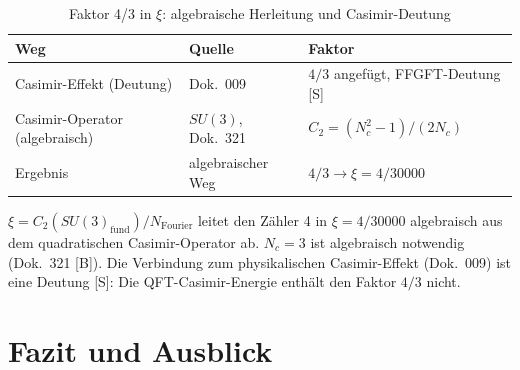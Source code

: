 \begin{table}[h]
\centering
\caption{Faktor 4/3 in $\xi$: algebraische Herleitung und Casimir-Deutung}
\label{tab:casimir_wege}
\begin{tabular}{lll}
\toprule
Weg & Quelle & Faktor \\
\midrule
Casimir-Effekt (Deutung) & Dok.~009 & $4/3$ angefügt, FFGFT-Deutung [S] \\
Casimir-Operator (algebraisch) & $SU(3)$, Dok.~321 & $C_2 = (N_c^2-1)/(2N_c)$ \\
\midrule
Ergebnis & algebraischer Weg & $4/3 \to \xi = 4/30000$ \\
\bottomrule
\end{tabular}
\end{table}

\begin{keyresult}
$\xi = C_2(SU(3)_{\text{fund}})/N_{\text{Fourier}}$ leitet den
Zähler 4 in $\xi = 4/30000$ algebraisch aus dem quadratischen
Casimir-Operator ab. $N_c = 3$ ist algebraisch notwendig (Dok.~321 [B]).
Die Verbindung zum physikalischen Casimir-Effekt (Dok.~009) ist eine
Deutung [S]: Die QFT-Casimir-Energie enthält den Faktor $4/3$ nicht.
\end{keyresult}


\section{Fazit und Ausblick}


